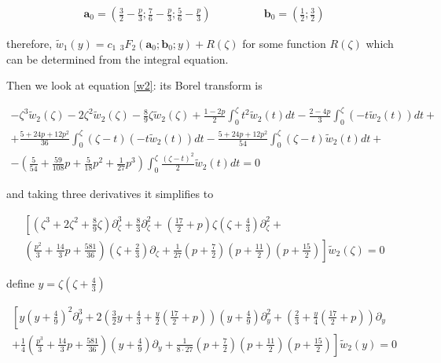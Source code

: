 \documentclass{article}
\begin{document}
\begin{align*}
\mathbf{a}_0=\left(\frac{3}{2}-\frac{p}{3};\frac{7}{6}-\frac{p}{3};\frac{5}{6}-\frac{p}{3}\right) & \qquad\qquad \mathbf{b}_0=\left(\frac{1}{2};\frac{3}{2}\right)
\end{align*}

therefore, $\tilde{w}_1(y)=c_1\,\,{}_3F_2\left(\mathbf{a}_0;\mathbf{b}_0;y\right)+R(\zeta)$ for some function $R(\zeta)$ which can be determined from the integral equation.

  

Then we look at equation \eqref{w2}: its Borel transform is

\begin{multline}
-\zeta^3\tilde{w}_2(\zeta)-2\zeta^2\tilde{w}_2(\zeta)-\frac{8}{9}\zeta\tilde{w}_2(\zeta)+\frac{1-2p}{2}\int_0^\zeta t^2\tilde{w}_2(t)dt-\frac{2-4p}{3}\int_0^\zeta(-t\tilde{w}_2(t))dt+\\
+\frac{5+24p+12p^2}{36}\int_0^\zeta(\zeta-t)(-t\tilde{w}_2(t))dt
-\frac{5+24p+12p^2}{54}\int_0^\zeta(\zeta-t)\tilde{w}_2(t)dt +\\
-\left(\frac{5}{54}+\frac{59}{108}p+\frac{5}{18}p^2+\frac{1}{27}p^3\right)\int_0^\zeta\frac{(\zeta-t)^2}{2}\tilde{w}_2(t)dt=0
\end{multline} 

and taking three derivatives it simplifies to 

\begin{multline}
\left[\left(\zeta^3+2\zeta^2+\frac{8}{9}\zeta\right)\partial_\zeta^3 +\frac{8}{3}\partial_\zeta^2+\left(\frac{17}{2}+p\right)\zeta\left(\zeta+\frac{4}{3}\right)\partial_\zeta^2+\right.\\
\left. \left(\frac{p^2}{3}+\frac{14}{3}p+\frac{581}{36}\right)\left(\zeta+\frac{2}{3}\right)\partial_\zeta+\frac{1}{27}\left(p+\frac{7}{2}\right)\left(p+\frac{11}{2}\right)\left(p+\frac{15}{2}\right)\right]\tilde{w}_2(\zeta)=0
\end{multline}

define $y=\zeta\left(\zeta+\frac{4}{3}\right)$

\begin{multline}\label{eq1}
\left[y\left(y+\frac{4}{9}\right)^2\partial_y^3+2\left(\frac{3}{2}y+\frac{4}{3}+\frac{y}{2}\left(\frac{17}{2}+p\right)\right)\left(y+\frac{4}{9}\right)\partial_y^2+\left(\frac{2}{3}+\frac{y}{4}\left(\frac{17}{2}+p\right)\right)\partial_y\right.\\
\left.+\frac{1}{4}\left(\frac{p^3}{3}+\frac{14}{3}p+\frac{581}{36}\right)\left(y+\frac{4}{9}\right)\partial_y+\frac{1}{8\cdot 27}\left(p+\frac{7}{2}\right)\left(p+\frac{11}{2}\right)\left(p+\frac{15}{2}\right)\right]\tilde{w}_2(y)=0
\end{multline}
\end{document}

